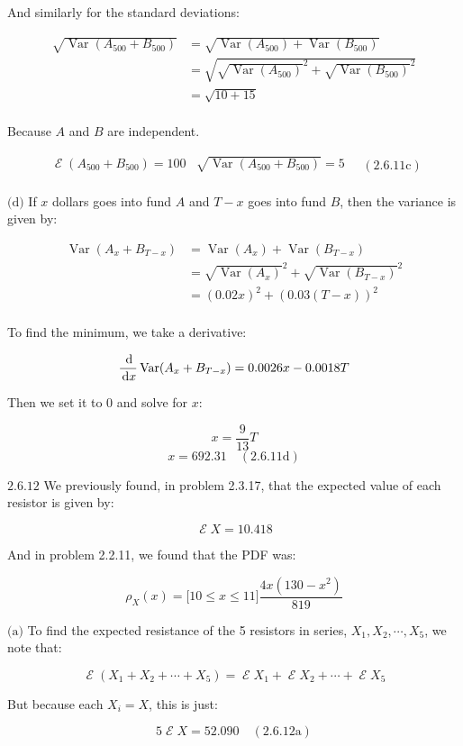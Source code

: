 \documentclass{article}
\newcommand{\problem}[2]{$\boxed{\text{#1.#2}}$}
\newcommand{\subproblem}[3]{$\boxed{\text{(#3)}}$}
\newcommand{\subsolution}[4]{\boxed{#4\quad(\text{#1.#2#3})}}
\renewcommand{\d}[1]{\,\textnormal{d}#1}
\newcommand{\dd}[2]{\frac{\d{#1}}{\d{#2}}}
\DeclareMathOperator{\var}{Var}
\DeclareMathOperator{\E}{\mathcal{E}}
\begin{document}
And similarly for the standard deviations:

\[
\begin{array}{rl}
\sqrt{\var(A_{500}+B_{500})} &= \sqrt{\var(A_{500})+\var(B_{500})} \\
&=\sqrt{\sqrt{\var(A_{500})}^2+\sqrt{\var(B_{500})}^2} \\
&=\sqrt{10+15} \\
\end{array}
\]

Because $A$ and $B$ are independent.

\[
\subsolution{2.6}{11}{c}{\begin{array}{cc}
\E(A_{500}+B_{500})=100 & \sqrt{\var(A_{500}+B_{500})} = 5 \\
\end{array}}
\]

%
\subproblem{2.6}{11}{d} If $x$ dollars goes into fund $A$ and $T-x$
goes into fund $B$, then the variance is given by:

\[
\begin{array}{rl}
\var(A_x + B_{T-x}) &= \var(A_x) + \var(B_{T-x}) \\
&= \sqrt{\var(A_x)}^2 + \sqrt{\var(B_{T-x})}^2 \\
&= (0.02x)^2 + (0.03(T-x))^2 \\
\end{array}
\]

To find the minimum, we take a derivative:

\[
\dd{}{x}\var(A_x+B_{T-x}) = 0.0026 x - 0.0018 T
\]

Then we set it to $0$ and solve for $x$:

\[
x=\frac{9}{13} T
\] \[
\subsolution{2.6}{11}{d}{x=692.31}
\]

%
\problem{2.6}{12} We previously found, in problem 2.3.17, that the
expected value of each resistor is given by:

\[
\E X=10.418
\]

And in problem 2.2.11, we found that the PDF was:

\[
\rho_X(x)=\lbrack 10\le x\le 11\rbrack \frac{4x(130-x^2)}{819}
\]

%
\subproblem{2.6}{12}{a} To find the expected resistance of the 5
resistors in series, $X_1,X_2,\cdots,X_5$, we note that:

\[
\E(X_1+X_2+\cdots+X_5)=\E X_1 + \E X_2 + \cdots + \E X_5
\]

But because each $X_i=X$, this is just:

\[
\subsolution{2.6}{12}{a}{5 \E X =52.090}
\]
\end{document}
